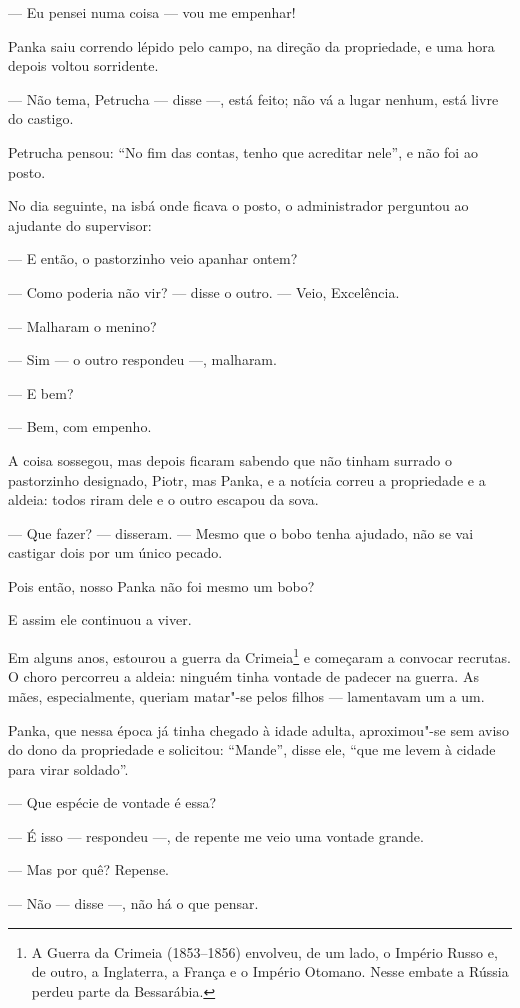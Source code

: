 --- Eu pensei numa coisa --- vou me empenhar!

Panka saiu correndo lépido pelo campo, na direção da propriedade, e
uma hora depois voltou sorridente.

--- Não tema, Petrucha --- disse ---, está feito; não vá a lugar nenhum,
está livre do castigo.

Petrucha pensou: ``No fim das contas, tenho que acreditar nele'', e não
foi ao posto.

No dia seguinte, na isbá onde ficava o posto, o administrador perguntou
ao ajudante do supervisor:

--- E então, o pastorzinho veio apanhar ontem?

--- Como poderia não vir? --- disse o outro. --- Veio, Excelência.

--- Malharam o menino?

--- Sim --- o outro respondeu ---, malharam.

--- E bem?

--- Bem, com empenho.

A coisa sossegou, mas depois ficaram sabendo que não tinham surrado o
pastorzinho designado, Piotr, mas Panka, e a notícia correu a
propriedade e a aldeia: todos riram dele e o outro escapou da sova.

--- Que fazer? --- disseram. --- Mesmo que o bobo tenha ajudado, não se
vai castigar dois por um único pecado.

Pois então, nosso Panka não foi mesmo um bobo?

E assim ele continuou a viver.

Em alguns anos, estourou a guerra da Crimeia\footnote{A Guerra da
  Crimeia (1853--1856) envolveu, de um lado, o Império Russo e, de outro,
  a Inglaterra, a França e o Império Otomano. Nesse embate a Rússia
  perdeu parte da Bessarábia.} e começaram a convocar recrutas. O choro
percorreu a aldeia: ninguém tinha vontade de padecer na guerra. As mães,
especialmente, queriam matar"-se pelos filhos --- lamentavam um a um.

Panka, que nessa época já tinha chegado à idade adulta, aproximou"-se sem
aviso do dono da propriedade e solicitou: ``Mande'', disse ele, ``que me
levem à cidade para virar soldado''.

--- Que espécie de vontade é essa?

--- É isso --- respondeu ---, de repente me veio uma vontade grande.

--- Mas por quê? Repense.

--- Não --- disse ---, não há o que pensar.

